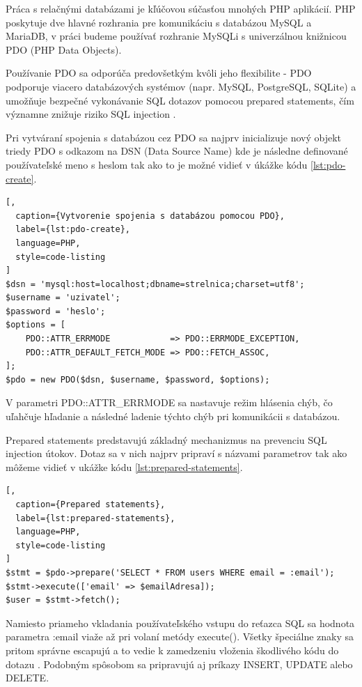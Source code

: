 Práca s relačnými databázami je kľúčovou súčasťou mnohých PHP aplikácií. PHP poskytuje dve hlavné rozhrania pre komunikáciu 
s databázou MySQL a MariaDB, v práci budeme používať rozhranie MySQLi s univerzálnou knižnicou PDO (PHP Data Objects). 

Používanie PDO sa odporúča predovšetkým kvôli jeho flexibilite - PDO podporuje viacero databázových systémov (napr. MySQL, PostgreSQL, SQLite) a 
umožňuje bezpečné vykonávanie SQL dotazov pomocou prepared statements, čím významne znižuje riziko SQL 
injection \cite{php_manual_pdo}.

Pri vytváraní spojenia s databázou cez PDO sa najprv inicializuje nový objekt triedy PDO s odkazom na DSN 
(Data Source Name) kde je následne definované používateľské meno s heslom tak ako to je možné vidieť v úkážke 
kódu \ref{lst:pdo-create}.

\begin{lstlisting}[,
  caption={Vytvorenie spojenia s databázou pomocou PDO},
  label={lst:pdo-create},
  language=PHP,
  style=code-listing
]
$dsn = 'mysql:host=localhost;dbname=strelnica;charset=utf8';
$username = 'uzivatel';
$password = 'heslo';
$options = [
    PDO::ATTR_ERRMODE            => PDO::ERRMODE_EXCEPTION,
    PDO::ATTR_DEFAULT_FETCH_MODE => PDO::FETCH_ASSOC,
];
$pdo = new PDO($dsn, $username, $password, $options);
\end{lstlisting}

V parametri PDO::ATTR\_ERRMODE sa nastavuje režim hlásenia chýb, čo uľahčuje hľadanie a následné ladenie týchto chýb pri 
komunikácii s databázou.  

Prepared statements predstavujú základný mechanizmus na prevenciu SQL injection útokov. Dotaz sa v nich najprv pripraví s 
názvami parametrov tak ako môžeme vidieť v ukážke kódu \ref{lst:prepared-statements}.

\begin{lstlisting}[,
  caption={Prepared statements},
  label={lst:prepared-statements},
  language=PHP,
  style=code-listing
]
$stmt = $pdo->prepare('SELECT * FROM users WHERE email = :email');
$stmt->execute(['email' => $emailAdresa]);
$user = $stmt->fetch();
\end{lstlisting}

Namiesto priameho vkladania používateľského vstupu do reťazca SQL sa hodnota parametra :email viaže až pri volaní 
metódy execute(). Všetky špeciálne znaky sa pritom správne escapujú a to vedie k zamedzeniu vloženia škodlivého 
kódu do dotazu \cite{owasp_sql_injection}. Podobným spôsobom sa pripravujú aj príkazy INSERT, UPDATE alebo DELETE.


